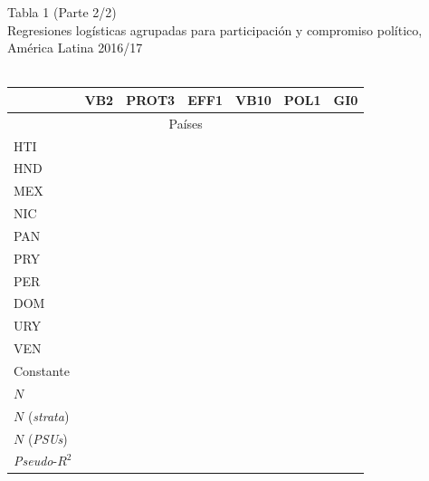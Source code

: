 \documentclass[a4paper]{tufte-handout}
\begin{document}
\begin{table}[h]
  \centering
  \selectfont
   \smallskip\noindent\small Tabla 1 (Parte 2/2) \\ Regresiones logísticas agrupadas para participación y compromiso político, América Latina 2016/17 \\~\\
  \begin{tabular}{l c c c c c c}
    \toprule
     & VB2 & PROT3 & EFF1 & VB10 & POL1 & GI0 \\ \midrule
    \multicolumn{7}{c}{Países} \\ \midrule
    \multirow{2}{*}{HTI} & & & & & & \\
    & & & & & & \\ 
    \multirow{2}{*}{HND} & & & & & & \\
    & & & & & & \\
    \multirow{2}{*}{MEX} & & & & & & \\
    & & & & & & \\
    \multirow{2}{*}{NIC} & & & & & & \\
    & & & & & & \\
    \multirow{2}{*}{PAN} & & & & & & \\
    & & & & & & \\
    \multirow{2}{*}{PRY} & & & & & & \\
    & & & & & & \\
    \multirow{2}{*}{PER} & & & & & & \\
    & & & & & & \\ 
    \multirow{2}{*}{DOM} & & & & & & \\
    & & & & & & \\ 
    \multirow{2}{*}{URY} & & & & & & \\
    & & & & & & \\
    \multirow{2}{*}{VEN} & & & & & & \\
    & & & & & & \\ \midrule
    \multirow{2}{*}{Constante} & & & & & & \\
    & & & & & & \\ \midrule
    $N$ & & & & & & \\
    $N$ ({\itshape strata}) & & & & & & \\
    $N$ ({\itshape PSUs}) & & & & & & \\ \midrule
    {\itshape Pseudo}-$R^2$ & & & & & & \\ \bottomrule
  \end{tabular}

\end{table}
\end{document}
